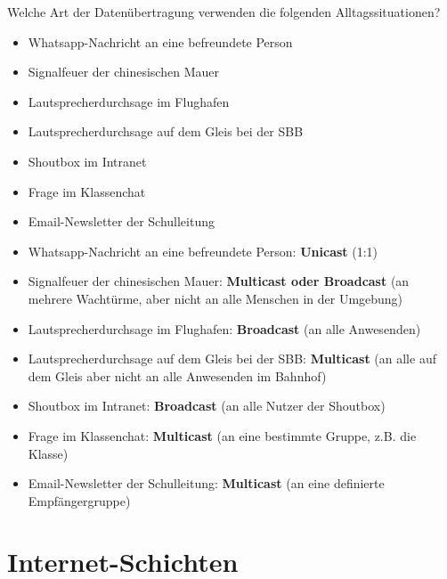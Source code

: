 \begin{myexercise}
Welche Art der Datenübertragung verwenden die folgenden Alltagssituationen?
\begin{itemize}
	\item Whatsapp-Nachricht an eine befreundete Person
	\item Signalfeuer der chinesischen Mauer
	\item Lautsprecherdurchsage im Flughafen
	\item Lautsprecherdurchsage auf dem Gleis bei der SBB
	\item Shoutbox im Intranet
	\item Frage im Klassenchat
	\item Email-Newsletter der Schulleitung
\end{itemize}
\begin{myanswer}
\begin{itemize}
	\item Whatsapp-Nachricht an eine befreundete Person: \textbf{Unicast} (1:1)
	\item Signalfeuer der chinesischen Mauer: \textbf{Multicast oder Broadcast} (an mehrere Wachtürme, aber nicht an alle Menschen in der Umgebung)
	\item Lautsprecherdurchsage im Flughafen: \textbf{Broadcast} (an alle Anwesenden)
	\item Lautsprecherdurchsage auf dem Gleis bei der SBB: \textbf{Multicast} (an alle auf dem Gleis aber nicht an alle Anwesenden im Bahnhof)
	\item Shoutbox im Intranet: \textbf{Broadcast} (an alle Nutzer der Shoutbox)
	\item Frage im Klassenchat: \textbf{Multicast} (an eine bestimmte Gruppe, z.B. die Klasse)
	\item Email-Newsletter der Schulleitung: \textbf{Multicast} (an eine definierte Empfängergruppe)
\end{itemize}
\end{myanswer}
\end{myexercise}

\newpage
\section{Internet-Schichten}
